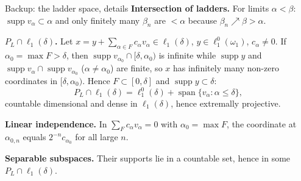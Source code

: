 \documentclass[10pt,aspectratio=169]{beamer}
\newcommand{\lo}[1]{\ell_1^0(#1)}
\newcommand{\ellone}[1]{\ell_1(#1)}
\newcommand{\supp}{\operatorname{supp}}
\newcommand{\Lin}{\operatorname{span}}
\begin{document}
\begin{frame}{Backup: the ladder space, details}
  \textbf{Intersection of ladders.} For limits $\alpha<\beta$: $\supp v_\alpha\subset\alpha$
  and only finitely many $\beta_n$ are $<\alpha$ because $\beta_n\nearrow\beta>\alpha$.
  \medskip

  \textbf{$P_L\cap\ellone\delta$.} Let $x=y+\sum_{\alpha\in F}c_\alpha v_\alpha\in\ellone\delta$,
  $y\in\lo{\omega_1}$, $c_\alpha\ne0$. If $\alpha_0=\max F>\delta$, then
  $\supp v_{\alpha_0}\cap[\delta,\alpha_0)$ is infinite while $\supp y$ and
  $\supp v_\alpha\cap\supp v_{\alpha_0}$ ($\alpha\ne\alpha_0$) are finite, so $x$
  has infinitely many non-zero coordinates in $[\delta,\alpha_0)$. Hence
  $F\subset[0,\delta]$ and $\supp y\subset\delta$:
  \[
    P_L\cap\ellone\delta=\lo\delta+\Lin\{v_\alpha:\alpha\le\delta\},
  \]
  countable dimensional and dense in $\ellone\delta$, hence extremally projective.
  \medskip

  \textbf{Linear independence.} In $\sum_Fc_\alpha v_\alpha=0$ with $\alpha_0=\max F$,
  the coordinate at $\alpha_{0,n}$ equals $2^{-n}c_{\alpha_0}$ for all large $n$.
  \medskip

  \textbf{Separable subspaces.} Their supports lie in a countable set, hence in
  some $P_L\cap\ellone\delta$.
\end{frame}
\end{document}
